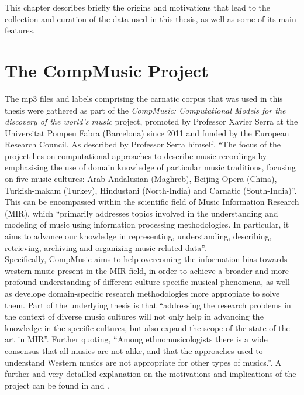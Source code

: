 This chapter describes briefly the origins and motivations that lead to the collection and curation of the data used in this thesis, as well as some of its main features.


\section{The CompMusic Project}\label{compmsc}

The mp3 files and labels comprising the carnatic corpus that was used in this thesis were gathered as part of the {\it CompMusic: Computational Models for the discovery of the world's music} project, promoted by Professor Xavier Serra at the Universitat Pompeu Fabra (Barcelona) since 2011 and funded by the European Research Council. As described by Professor Serra himself\cite{serra-comp14}, ``The focus of the project lies on computational approaches to describe music recordings by emphasising the use of domain knowledge of particular music traditions, focusing on five music cultures: Arab-Andalusian (Maghreb), Beijing Opera (China), Turkish-makam (Turkey), Hindustani (North-India) and Carnatic (South-India)''. This can be encompassed within the scientific field of Music Information Research (MIR), which ``primarily addresses topics involved in the understanding and modeling of music using information processing methodologies. In particular, it aims to advance our knowledge in representing, understanding, describing, retrieving, archiving and organizing music related data''\cite[p.3]{gulati}.\\

Specifically, CompMusic aims to help overcoming the information bias towards western music present in the MIR field, in order to achieve a broader and more profound understanding of different culture-specific musical phenomena, as well as develope domain-specific research methodologies more appropiate to solve them. Part of the underlying thesis is that ``addressing the research problems in the context of diverse music cultures will not only help in advancing the knowledge in the specific cultures, but also expand the scope of the state of the art in MIR''\cite[p.4]{gulati}. Further quoting, ``Among ethnomusicologists there is a wide consensus that all musics are not alike, and that the approaches used to understand Western musics are not appropriate for other types of musics.''\cite{serra-comp14}. A further and very detailled explanation on the motivations and implications of the project can be found in \cite{serra-comp11} and \cite{serra-comp14}.\\

